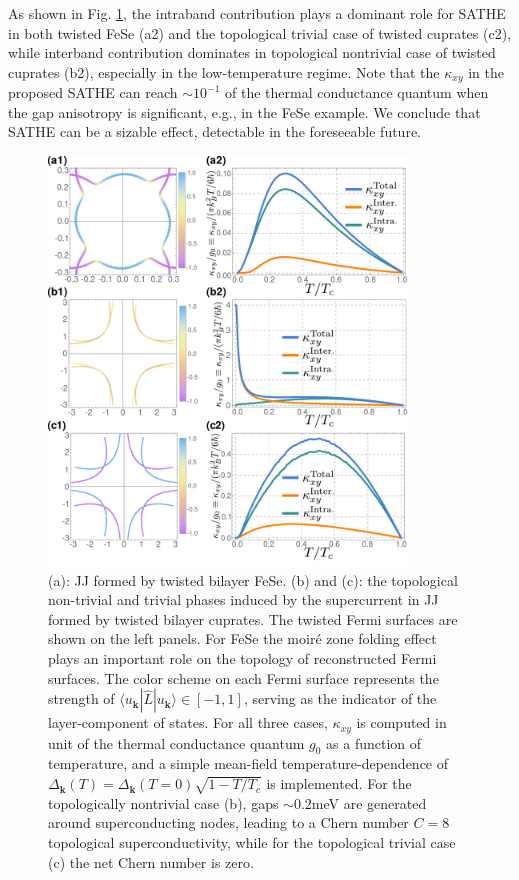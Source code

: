As shown in Fig. \ref{fig: FS and kappa_xy}, the intraband contribution plays a dominant role for SATHE in both twisted FeSe (a2) and the topological trivial case of twisted cuprates (c2), while interband contribution dominates in topological nontrivial case of twisted cuprates (b2), especially in the low-temperature regime. 
Note that the $\kappa_{xy}$ in the proposed SATHE can reach $\sim 10^{-1}$ of the thermal conductance quantum when the gap anisotropy is significant, e.g., in the FeSe example. We conclude that SATHE can be a sizable effect, detectable in the foreseeable future.
\begin{figure}[!ht]
	\centering
	\includegraphics[width=0.85\textwidth]{contents/SATHE/figures/combined.pdf}
	\caption{(a): JJ formed by twisted bilayer FeSe. (b) and (c): the topological non-trivial and trivial phases induced by the supercurrent in JJ formed by twisted bilayer cuprates. The twisted Fermi surfaces are shown on the left panels. For FeSe the moir\'e zone folding effect plays an important role on the topology of reconstructed Fermi surfaces. The color scheme on each Fermi surface represents the strength of $\langle u_{\bm{k}}|\hat{L}|u_{\bm{k}}\rangle\in[-1,1]$, serving as the indicator of the layer-component of states. For all three cases, $\kappa_{xy}$ is computed in unit of the thermal conductance quantum $g_0$ as a function of temperature, and a simple mean-field temperature-dependence of $\varDelta_{\bm{k}}(T)=\varDelta_{\bm{k}}(T=0)\sqrt{1-T/T_c}$ is implemented. For the topologically nontrivial case (b), gaps $\sim 0.2$meV are generated around superconducting nodes, leading to a Chern number $C=8$ topological superconductivity, while for the topological trivial case (c) the net Chern number is zero.}
	\label{fig: FS and kappa_xy}
\end{figure}



